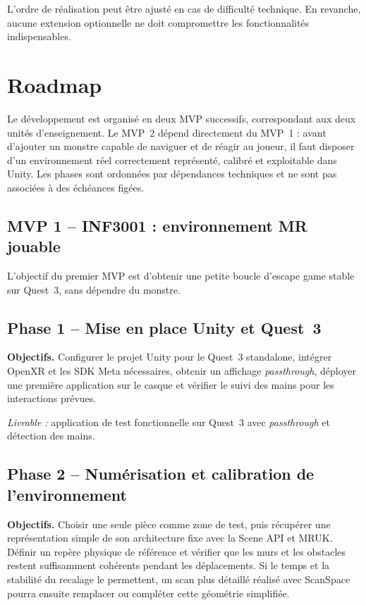 \documentclass[11pt,a4paper]{article}
\begin{document}
L'ordre de réalisation peut être ajusté en cas de difficulté technique. En revanche, aucune extension optionnelle ne doit compromettre les fonctionnalités indispensables.

\clearpage
\section{Roadmap}

Le développement est organisé en deux MVP successifs, correspondant aux deux unités d'enseignement. Le MVP~2 dépend directement du MVP~1 : avant d'ajouter un monstre capable de naviguer et de réagir au joueur, il faut disposer d'un environnement réel correctement représenté, calibré et exploitable dans Unity. Les phases sont ordonnées par dépendances techniques et ne sont pas associées à des échéances figées.

\subsection*{MVP 1 -- INF3001 : environnement MR jouable}

L'objectif du premier MVP est d'obtenir une petite boucle d'escape game stable sur Quest~3, sans dépendre du monstre.

\subsection*{Phase 1 -- Mise en place Unity et Quest~3}

\textbf{Objectifs.} Configurer le projet Unity pour le Quest~3 standalone, intégrer OpenXR et les SDK Meta nécessaires, obtenir un affichage \emph{passthrough}, déployer une première application sur le casque et vérifier le suivi des mains pour les interactions prévues.

\textit{Livrable :} application de test fonctionnelle sur Quest~3 avec \emph{passthrough} et détection des mains.

\subsection*{Phase 2 -- Numérisation et calibration de l'environnement}

\textbf{Objectifs.} Choisir une seule pièce comme zone de test, puis récupérer une représentation simple de son architecture fixe avec la Scene API et MRUK. Définir un repère physique de référence et vérifier que les murs et les obstacles restent suffisamment cohérents pendant les déplacements. Si le temps et la stabilité du recalage le permettent, un scan plus détaillé réalisé avec ScanSpace pourra ensuite remplacer ou compléter cette géométrie simplifiée.
\end{document}
